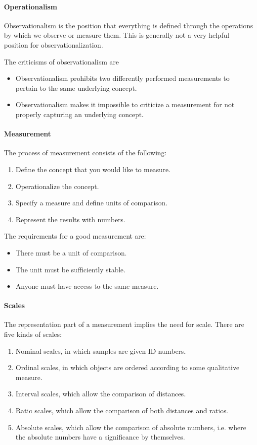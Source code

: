 \paragraph{Operationalism}
Observationalism is the position that everything is defined through the operations by which  we observe or measure them. This is generally not a very helpful position for observationalization.

The criticisms of observationalism are
\begin{itemize}
	\item Observationalism prohibits two differently performed measurements to pertain to the same underlying concept.
	\item Observationalism makes it impossible to criticize a measurement for not properly capturing an underlying concept.
\end{itemize}

\paragraph{Measurement}
The process of measurement consists of the following:
\begin{enumerate}
	\item Define the concept that you would like to measure.
	\item Operationalize the concept.
	\item Specify a measure and define units of comparison.
	\item Represent the results with numbers.
\end{enumerate}

The requirements for a good measurement are:
\begin{itemize}
	\item There must be a unit of comparison.
	\item The unit must be sufficiently stable.
	\item Anyone must have access to the same measure.
\end{itemize}

\paragraph{Scales}
The representation part of a measurement implies the need for scale. There are five kinds of scales:
\begin{enumerate}
	\item Nominal scales, in which samples are given ID numbers.
	\item Ordinal scales, in which objects are ordered according to some qualitative measure.
	\item Interval scales, which allow the comparison of distances.
	\item Ratio scales, which allow the comparison of both distances and ratios.
	\item Absolute scales, which allow the comparison of absolute numbers, i.e. where the absolute numbers have a significance by themselves.
\end{enumerate}

